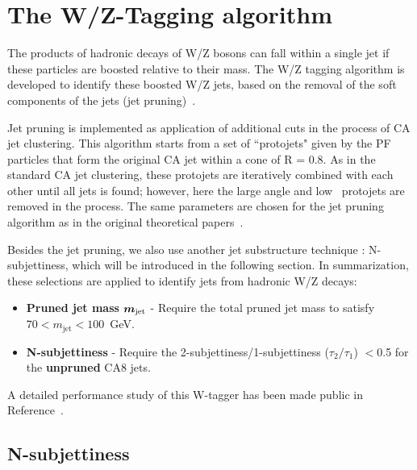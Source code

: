 \section{The W/Z-Tagging algorithm}
\label{sec: W/Z tagging1}

The products of hadronic decays of W/Z bosons can
fall within a single jet if these particles are boosted relative to
their mass.  The W/Z tagging algorithm is developed to
identify these boosted W/Z jets, based on the removal of the soft
components of the jets (jet pruning)~\cite{catop_cms,topwtag_pas}.

 Jet pruning is implemented as application of additional cuts in the process
of CA jet clustering. This algorithm starts from a set of ``protojets" given by the PF particles
that form the original CA jet within a cone of R = 0.8. As in the standard CA jet clustering,
these protojets are iteratively combined with each other until all jets is found; however, here
the large angle and low \pt~protojets are removed in the process. 
The same parameters are chosen for the jet pruning algorithm
as in the original theoretical papers~\cite{jetpruning1,jetpruning2}.

Besides the jet pruning, we also use another jet substructure technique :
N-subjettiness, which will be introduced in the following section. 
In summarization,  these selections are applied
to identify jets from hadronic W/Z decays:

\begin{itemize}

\item {\bf Pruned jet mass}  $\mbox{\boldmath$m_{\text{jet}}$}$
  - Require the total pruned jet mass to satisfy $70 < m_\text{jet} < 100$~GeV.

\item {\bf N-subjettiness} 
  - Require the 2-subjettiness/1-subjettiness ($\tau_{2}/\tau_{1}$) $< $0.5 for the {\bf unpruned} CA8 jets. 
\end{itemize}

A detailed performance study of this W-tagger has been made public in Reference~\cite{JME-13-006}.

\subsection{N-subjettiness}
\label{sec:N-subjettiness1}

